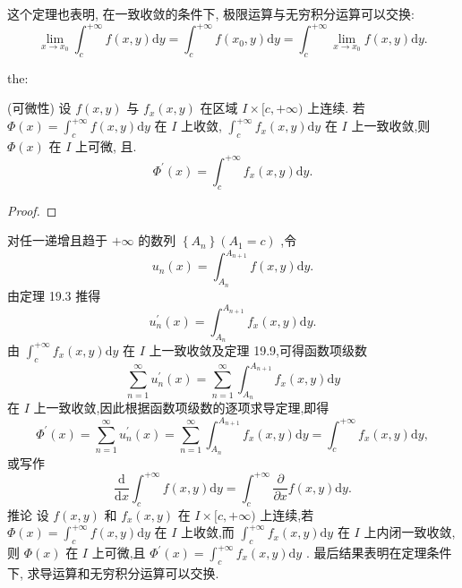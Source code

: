 这个定理也表明, 在一致收敛的条件下, 极限运算与无穷积分运算可以交换:
\[
\mathop{\lim }\limits_{{x \rightarrow  {x}_{0}}}{\int }_{c}^{+\infty }f\left( {x,y}\right) \mathrm{d}y = {\int }_{c}^{+\infty }f\left( {{x}_{0},y}\right) \mathrm{d}y = {\int }_{c}^{+\infty }\mathop{\lim }\limits_{{x \rightarrow  {x}_{0}}}f\left( {x,y}\right) \mathrm{d}y. \tag{14}
\]
\begin{theorem}{}{the:}

\end{theorem}
 (可微性) 设 \(f\left( {x,y}\right)\) 与 \({f}_{x}\left( {x,y}\right)\) 在区域 \(I \times  \lbrack c, + \infty )\) 上连续. 若 \(\Phi \left( x\right)  = {\int }_{c}^{+\infty }f\left( {x,y}\right) \mathrm{d}y\) 在 \(I\) 上收敛, \({\int }_{c}^{+\infty }{f}_{x}\left( {x,y}\right) \mathrm{d}y\) 在 \(I\) 上一致收敛,则 \(\Phi \left( x\right)\) 在 \(I\) 上可微, 且.
\[
{\Phi }^{\prime }\left( x\right)  = {\int }_{c}^{+\infty }{f}_{x}\left( {x,y}\right) \mathrm{d}y. \tag{15}
\]
\begin{proof}

\end{proof}
对任一递增且趋于 \(+ \infty\) 的数列 \(\left\{  {A}_{n}\right\}  \left( {{A}_{1} = c}\right)\) ,令
\[
{u}_{n}\left( x\right)  = {\int }_{{A}_{n}}^{{A}_{n + 1}}f\left( {x,y}\right) \mathrm{d}y.
\]
由定理 19.3 推得
\[
{u}_{n}^{\prime }\left( x\right)  = {\int }_{{A}_{n}}^{{A}_{n + 1}}{f}_{x}\left( {x,y}\right) \mathrm{d}y.
\]
由 \({\int }_{c}^{+\infty }{f}_{x}\left( {x,y}\right) \mathrm{d}y\) 在 \(I\) 上一致收敛及定理 19.9,可得函数项级数
\[
\mathop{\sum }\limits_{{n = 1}}^{\infty }{u}_{n}^{\prime }\left( x\right)  = \mathop{\sum }\limits_{{n = 1}}^{\infty }{\int }_{{A}_{n}}^{{A}_{n + 1}}{f}_{x}\left( {x,y}\right) \mathrm{d}y
\]
在 \(I\) 上一致收敛,因此根据函数项级数的逐项求导定理,即得
\[
{\Phi }^{\prime }\left( x\right)  = \mathop{\sum }\limits_{{n = 1}}^{\infty }{u}_{n}^{\prime }\left( x\right)  = \mathop{\sum }\limits_{{n = 1}}^{\infty }{\int }_{{A}_{n}}^{{A}_{n + 1}}{f}_{x}\left( {x,y}\right) \mathrm{d}y = {\int }_{c}^{+\infty }{f}_{x}\left( {x,y}\right) \mathrm{d}y,
\]
或写作
\[
\frac{\mathrm{d}}{\mathrm{d}x}{\int }_{c}^{+\infty }f\left( {x,y}\right) \mathrm{d}y = {\int }_{c}^{+\infty }\frac{\partial }{\partial x}f\left( {x,y}\right) \mathrm{d}y.
\]
推论 设 \(f\left( {x,y}\right)\) 和 \({f}_{x}\left( {x,y}\right)\) 在 \(I \times  \lbrack c, + \infty )\) 上连续,若 \(\Phi \left( x\right)  = {\int }_{c}^{+\infty }f\left( {x,y}\right) \mathrm{d}y\) 在 \(I\) 上收敛,而 \({\int }_{c}^{+\infty }{f}_{x}\left( {x,y}\right) \mathrm{d}y\) 在 \(I\) 上内闭一致收敛,则 \(\Phi \left( x\right)\) 在 \(I\) 上可微,且 \({\Phi }^{\prime }\left( x\right)  = {\int }_{c}^{+\infty }{f}_{x}\left( {x,y}\right) \mathrm{d}y\) . 最后结果表明在定理条件下, 求导运算和无穷积分运算可以交换.

